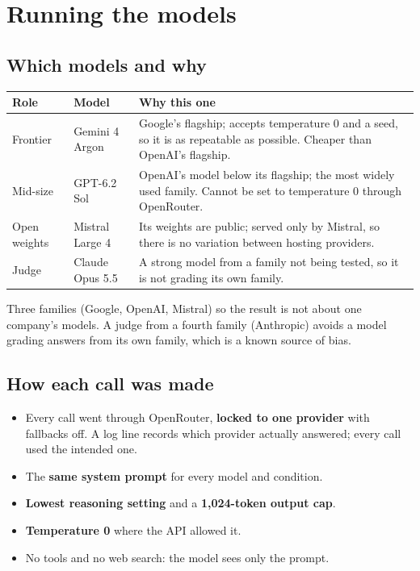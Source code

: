 \chapter{Running the models}

\section{Which models and why}

\begin{center}
\small
\begin{tabularx}{\textwidth}{@{}llX@{}}
\toprule
Role & Model & Why this one \\
\midrule
Frontier & Gemini 4 Argon & Google's flagship; accepts temperature 0 and a seed, so it is as repeatable as possible. Cheaper than OpenAI's flagship. \\
Mid-size & GPT-6.2 Sol & OpenAI's model below its flagship; the most widely used family. Cannot be set to temperature 0 through OpenRouter. \\
Open weights & Mistral Large 4 & Its weights are public; served only by Mistral, so there is no variation between hosting providers. \\
Judge & Claude Opus 5.5 & A strong model from a family not being tested, so it is not grading its own family. \\
\bottomrule
\end{tabularx}
\end{center}

\begin{why}
Three families (Google, OpenAI, Mistral) so the result is not about one company's models. A judge from a fourth family (Anthropic) avoids a model grading answers from its own family, which is a known source of bias.
\end{why}

\section{How each call was made}

\begin{itemize}
\item Every call went through OpenRouter, \textbf{locked to one provider} with fallbacks off. A log line records which provider actually answered; every call used the intended one.
\item The \textbf{same system prompt} for every model and condition.
\item \textbf{Lowest reasoning setting} and a \textbf{1,024-token output cap}.
\item \textbf{Temperature 0} where the API allowed it.
\item No tools and no web search: the model sees only the prompt.
\end{itemize}

